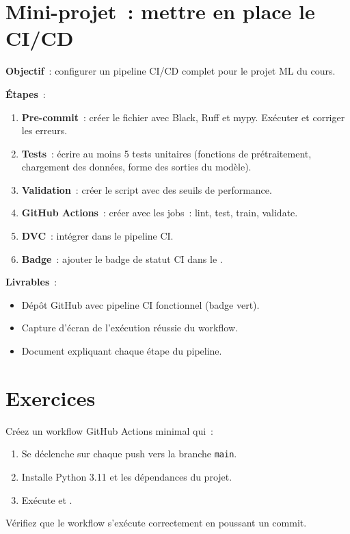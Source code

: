 \section{Mini-projet~: mettre en place le CI/CD}
\label{sec:cicd-miniproject}

\begin{miniprojet}[title=\textbf{CI/CD pour le projet de cours}]
\textbf{Objectif}~: configurer un pipeline CI/CD complet pour le projet ML du cours.

\textbf{\'Etapes}~:
\begin{enumerate}
    \item \textbf{Pre-commit}~: cr\'eer le fichier  avec Black, Ruff et mypy. Ex\'ecuter  et corriger les erreurs.
    \item \textbf{Tests}~: \'ecrire au moins 5 tests unitaires (fonctions de pr\'etraitement, chargement des donn\'ees, forme des sorties du mod\`ele).
    \item \textbf{Validation}~: cr\'eer le script  avec des seuils de performance.
    \item \textbf{GitHub Actions}~: cr\'eer  avec les jobs~: lint, test, train, validate.
    \item \textbf{DVC}~: int\'egrer  dans le pipeline CI.
    \item \textbf{Badge}~: ajouter le badge de statut CI dans le .
\end{enumerate}

\textbf{Livrables}~:
\begin{itemize}
    \item D\'ep\^ot GitHub avec pipeline CI fonctionnel (badge vert).
    \item Capture d'\'ecran de l'ex\'ecution r\'eussie du workflow.
    \item Document expliquant chaque \'etape du pipeline.
\end{itemize}
\end{miniprojet}

\section{Exercices}
\label{sec:cicd-exercises}

\begin{exercice}
Cr\'eez un workflow GitHub Actions minimal qui~:
\begin{enumerate}
    \item Se d\'eclenche sur chaque push vers la branche \texttt{main}.
    \item Installe Python 3.11 et les d\'ependances du projet.
    \item Ex\'ecute  et .
\end{enumerate}
V\'erifiez que le workflow s'ex\'ecute correctement en poussant un commit.
\end{exercice}

